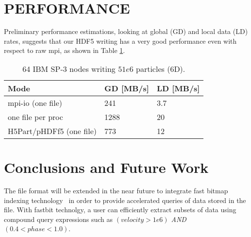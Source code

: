 \documentclass[acus]{JAC2003}
\begin{document}
\vspace{-5mm}
\section{PERFORMANCE}
Preliminary performance estimations, looking at global (GD) and local data (LD)
rates, suggests that our HDF5 writing has a very good performance even
with respect to raw mpi, as shown in Table \ref{tab:perf}.
\begin{table}[h!]
\begin{flushleft} \footnotesize
 \begin{tabular}{|l|l|l|}
\hline
\bf Mode & \bf GD [MB/s]  & \bf LD [MB/s]\\
\hline
mpi-io (one file) & 241 & 3.7 \\
\hline
one file per proc & 1288 & 20 \\
\hline
H5Part/pHDFf5 (one file) & 773 & 12 \\
\hline
\end{tabular}
\end{flushleft}
\caption{\label{tab:perf}{64 IBM SP-3 nodes writing $51e6$ particles (6D). }}
\end{table}
\vspace{-4mm}
\section{Conclusions and Future Work}
The file format will be extended in the near future to integrate fast bitmap indexing 
technology~\cite{DEX} in order to provide accelerated queries of data
stored in the file. With fastbit technolgy, a user can efficiently extract subsets of data
using compound query expressions such
as {\it $(velocity > 1e6)$ AND $(0.4 < phase < 1.0)$}. 
\end{document}
